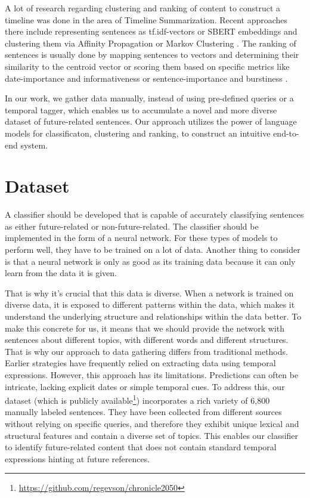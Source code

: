 \documentclass[a4paper,10pt]{report} %
\begin{document}
A lot of research regarding clustering and ranking of content to construct a timeline was done in the area of Timeline Summarization. Recent approaches there include representing sentences as tf.idf-vectors or SBERT embeddings and clustering them via Affinity Propagation \cite{abstractiveTimeline, multitimeline} or Markov Clustering \cite{stateOfTheArtTimeline}.
The ranking of sentences is usually done by mapping sentences to vectors and determining their similarity to the centroid vector \cite{stateOfTheArtTimeline} or scoring them based on specific metrics like date-importance and informativeness \cite{abstractiveTimeline} or sentence-importance and burstiness \cite{queryBased}.

In our work, we gather data manually, instead of using pre-defined queries or a temporal tagger, which enables us to accumulate a novel and more diverse dataset of future-related sentences. Our approach utilizes the power of language models for classificaton, clustering and ranking, to construct an intuitive end-to-end system.

\chapter{Dataset}
A classifier should be developed that is capable of accurately classifying sentences as either future-related or non-future-related. The classifier should be implemented in the form of a neural network. For these types of models to perform well, they have to be trained on a lot of data. Another thing to consider is that a neural network is only as good as its training data because it can only learn from the data it is given. 

That is why it's crucial that this data is diverse. When a network is trained on diverse data, it is exposed to different patterns within the data, which makes it understand the underlying structure and relationships within the data better. To make this concrete for us, it means that we should provide the network with sentences about different topics, with different words and different structures. That is why our approach to data gathering differs from traditional methods. Earlier strategies have frequently relied on extracting data using temporal expressions. However, this approach has its limitations. Predictions can often be intricate, lacking explicit dates or simple temporal cues. To address this, our dataset (which is publicly available\footnote{\url{https://github.com/regevson/chronicle2050}}) incorporates a rich variety of 6,800 manually labeled sentences. They have been collected from different sources without relying on specific queries, and therefore they exhibit unique lexical and structural features and contain a diverse set of topics. This enables our classifier to identify future-related content that does not contain standard temporal expressions hinting at future references.
\end{document}
